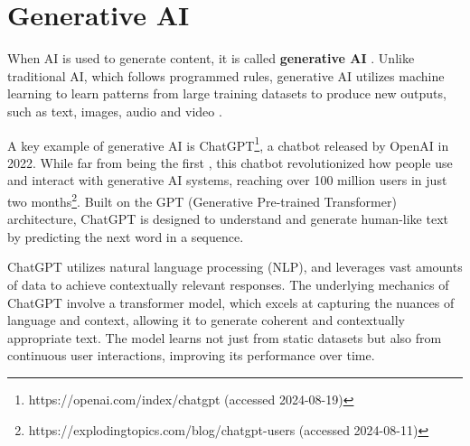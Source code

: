 
\section{Generative AI}
\begin{comment}

Artificial Intelligence, Generative AI (ChatGPT, etc)

What to cover:
    - Mitä tekoäly oikeastaan edes on?
    - What is Generative AI
    - OpenAI releasing ChatGPT to the public in 2022
    - NLP Natural Language Processing
    
What to skip:
    - GPT:n historian (versiot 1, 2, 3, 3.5 jne) eli keskitytään vain GPT versioon 4 ja uudempiiin
    
\end{comment}

When AI is used to generate content, it is called \textbf{generative AI} \citep{goodfellowGenerativeAdversarialNetworks2020}. Unlike traditional AI, which follows programmed rules, generative AI utilizes machine learning to learn patterns from large training datasets to produce new outputs, such as text, images, audio and video \citep{fakhouriAIDrivenSolutionsForSocialEngineeringAttacks2024}.

A key example of generative AI is ChatGPT\footnote{https://openai.com/index/chatgpt (accessed 2024-08-19)}, a chatbot released by OpenAI in 2022. While far from being the first \citep{weizenbaumELIZA1996}, this chatbot revolutionized how people use and interact with generative AI systems, reaching over 100 million users in just two months\footnote{https://explodingtopics.com/blog/chatgpt-users (accessed 2024-08-11)}. Built on the GPT (Generative Pre-trained Transformer) architecture, ChatGPT is designed to understand and generate human-like text by predicting the next word in a sequence.

ChatGPT utilizes natural language processing (NLP), and leverages vast amounts of data to achieve contextually relevant responses. The underlying mechanics of ChatGPT involve a transformer model, which excels at capturing the nuances of language and context, allowing it to generate coherent and contextually appropriate text. The model learns not just from static datasets but also from continuous user interactions, improving its performance over time.


















